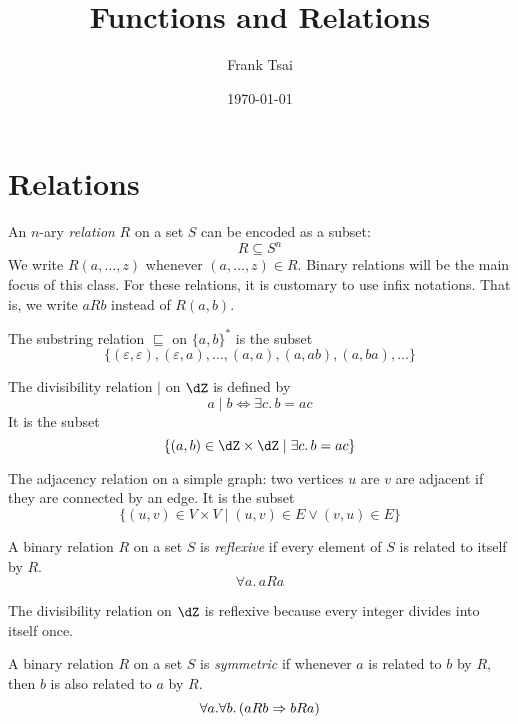 \documentclass{amsart}
\title{Functions and Relations}
\author{Frank Tsai}
\date{\today}
\begin{document}
\maketitle
\tableofcontents

\section{Relations}
\label{sec:relations}

\begin{defn}
  An $n$-ary \emph{relation} $R$ on a set $S$ can be encoded as a subset:
  \[
    R \subseteq S^{n}
  \]
  We write $R(a,\ldots,z)$ whenever $(a,\ldots,z) \in R$.
  Binary relations will be the main focus of this class.
  For these relations, it is customary to use infix notations.
  That is, we write $aRb$ instead of $R(a,b)$.
\end{defn}

\begin{eg}
  The substring relation $\sqsubseteq$ on $\{a,b\}^{*}$ is the subset
  \[
    \{(\varepsilon,\varepsilon), (\varepsilon, a), \ldots, (a, a), (a, ab), (a, ba), \ldots\}
  \]
\end{eg}

\begin{eg}
  The divisibility relation $\mid$ on $\dZ$ is defined by
  \[
    a \mid b \iff \exists c.\,b = ac
  \]
  It is the subset
  \[
    \{(a,b) \in \dZ \times \dZ \mid \exists c.\,b = ac\}
  \]
\end{eg}

\begin{eg}
  The adjacency relation on a simple graph: two vertices $u$ are $v$ are adjacent if they are connected by an edge.
  It is the subset
  \[
    \{(u,v) \in V \times V \mid (u, v) \in E \vee (v, u) \in E\}
  \]
\end{eg}

\begin{defn}[Reflexivity]
  A binary relation $R$ on a set $S$ is \emph{reflexive} if every element of $S$ is related to itself by $R$.
  \[
    \forall a.\,aRa
  \]
\end{defn}

\begin{eg}
  The divisibility relation on $\dZ$ is reflexive because every integer divides into itself once.
\end{eg}

\begin{defn}[Symmetry]
  A binary relation $R$ on a set $S$ is \emph{symmetric} if whenever $a$ is related to $b$ by $R$, then $b$ is also related to $a$ by $R$.
  \[
    \forall a.\forall b.\,(aRb \Rightarrow bRa)
  \]
\end{defn}
\end{document}
